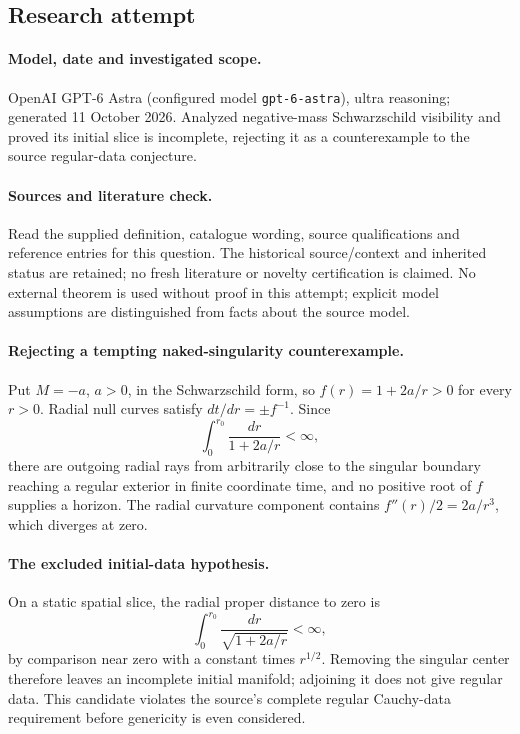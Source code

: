 \documentclass[11pt]{article}
\begin{document}
\subsection{Research attempt}
\paragraph{Model, date and investigated scope.}
OpenAI GPT-6 Astra (configured model \texttt{gpt-6-astra}), ultra reasoning; generated 11 October 2026. Analyzed negative-mass Schwarzschild visibility and proved its initial slice is incomplete, rejecting it as a counterexample to the source regular-data conjecture.

\paragraph{Sources and literature check.}
Read the supplied definition, catalogue wording, source qualifications and reference entries for this question. The historical source/context and inherited status are retained; no fresh literature or novelty certification is claimed. No external theorem is used without proof in this attempt; explicit model assumptions are distinguished from facts about the source model.

\paragraph{Rejecting a tempting naked-singularity counterexample.} Put \(M=-a\), \(a>0\), in the Schwarzschild form, so \(f(r)=1+2a/r>0\) for every \(r>0\). Radial null curves satisfy \(dt/dr=\pm f^{-1}\). Since
\[
 \int_0^{r_0}\frac{dr}{1+2a/r}<\infty,
\]
there are outgoing radial rays from arbitrarily close to the singular boundary reaching a regular exterior in finite coordinate time, and no positive root of \(f\) supplies a horizon. The radial curvature component contains \(f''(r)/2=2a/r^3\), which diverges at zero.
\paragraph{The excluded initial-data hypothesis.} On a static spatial slice, the radial proper distance to zero is
\[
 \int_0^{r_0}\frac{dr}{\sqrt{1+2a/r}}<\infty,
\]
by comparison near zero with a constant times \(r^{1/2}\). Removing the singular center therefore leaves an incomplete initial manifold; adjoining it does not give regular data. This candidate violates the source's complete regular Cauchy-data requirement before genericity is even considered.
\end{document}
